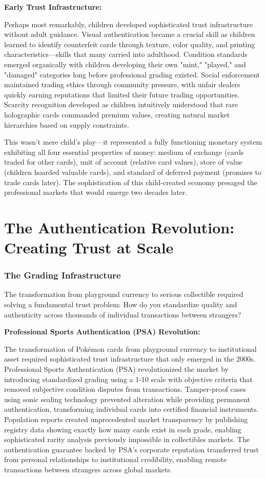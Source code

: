 \documentclass[11pt,oneside]{book}
\begin{document}
{{{{{{\textbf{Early Trust Infrastructure:}

Perhaps most remarkably, children developed sophisticated trust infrastructure without adult guidance. Visual authentication became a crucial skill as children learned to identify counterfeit cards through texture, color quality, and printing characteristics—skills that many carried into adulthood. Condition standards emerged organically with children developing their own "mint," "played," and "damaged" categories long before professional grading existed. Social enforcement maintained trading ethics through community pressure, with unfair dealers quickly earning reputations that limited their future trading opportunities. Scarcity recognition developed as children intuitively understood that rare holographic cards commanded premium values, creating natural market hierarchies based on supply constraints.

This wasn't mere child's play—it represented a fully functioning monetary system exhibiting all four essential properties of money: medium of exchange (cards traded for other cards), unit of account (relative card values), store of value (children hoarded valuable cards), and standard of deferred payment (promises to trade cards later). The sophistication of this child-created economy presaged the professional markets that would emerge two decades later.

\section{The Authentication Revolution: Creating Trust at Scale}

\subsubsection{The Grading Infrastructure}

The transformation from playground currency to serious collectible required solving a fundamental trust problem: How do you standardize quality and authenticity across thousands of individual transactions between strangers?

\textbf{Professional Sports Authentication (PSA) Revolution:}

The transformation of Pokémon cards from playground currency to institutional asset required sophisticated trust infrastructure that only emerged in the 2000s. Professional Sports Authentication (PSA) revolutionized the market by introducing standardized grading using a 1-10 scale with objective criteria that removed subjective condition disputes from transactions. Tamper-proof cases using sonic sealing technology prevented alteration while providing permanent authentication, transforming individual cards into certified financial instruments. Population reports created unprecedented market transparency by publishing registry data showing exactly how many cards exist in each grade, enabling sophisticated rarity analysis previously impossible in collectibles markets. The authentication guarantee backed by PSA's corporate reputation transferred trust from personal relationships to institutional credibility, enabling remote transactions between strangers across global markets.

}}}}}}
\end{document}

